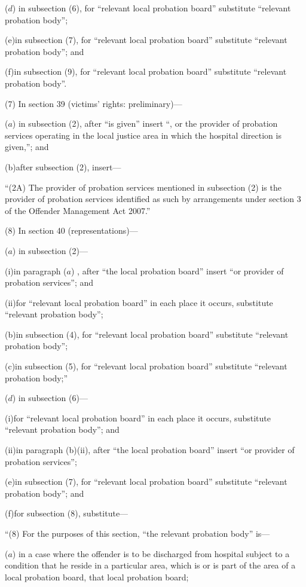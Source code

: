 \documentclass[12pt,a4paper]{article}
\begin{document}
($d$) in subsection (6), for “relevant local probation board” substitute “relevant probation body”;

(e)in subsection (7), for “relevant local probation board” substitute “relevant probation body”; and

(f)in subsection (9), for “relevant local probation board” substitute “relevant probation body”.

(7) In section 39 (victims’ rights: preliminary)—

($a$) in subsection (2), after “is given” insert “, or the provider of probation services operating in the local justice area in which the hospital direction is given,”; and

(b)after subsection (2), insert—

“(2A) The provider of probation services mentioned in subsection (2) is the provider of probation services identified as such by arrangements under section 3 of the Offender Management Act 2007.”

(8) In section 40 (representations)—

($a$) in subsection (2)—

(i)in paragraph ($a$) , after “the local probation board” insert “or provider of probation services”; and

(ii)for “relevant local probation board” in each place it occurs, substitute “relevant probation body”;

(b)in subsection (4), for “relevant local probation board” substitute “relevant probation body”;

(c)in subsection (5), for “relevant local probation board” substitute “relevant probation body;”

($d$) in subsection (6)—

(i)for “relevant local probation board” in each place it occurs, substitute “relevant probation body”; and

(ii)in paragraph (b)(ii), after “the local probation board” insert “or provider of probation services”;

(e)in subsection (7), for “relevant local probation board” substitute “relevant probation body”; and

(f)for subsection (8), substitute—

“(8) For the purposes of this section, “the relevant probation body” is—

($a$) in a case where the offender is to be discharged from hospital subject to a condition that he reside in a particular area, which is or is part of the area of a local probation board, that local probation board;
\end{document}
